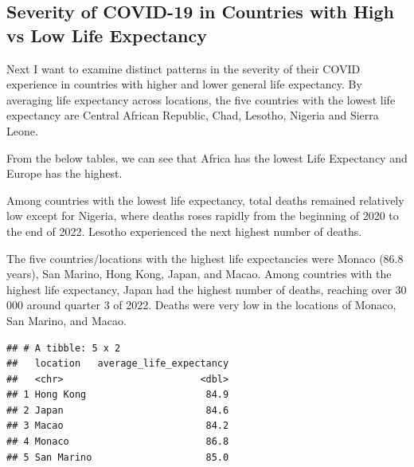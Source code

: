 \documentclass[11pt,preprint, authoryear]{elsarticle}
\numberwithin{equation}{section}
\numberwithin{figure}{section}
\numberwithin{table}{section}
\begin{document}
\hypertarget{severity-of-covid-19-in-countries-with-high-vs-low-life-expectancy}{%
\subsection{Severity of COVID-19 in Countries with High vs Low Life
Expectancy}\label{severity-of-covid-19-in-countries-with-high-vs-low-life-expectancy}}

Next I want to examine distinct patterns in the severity of their COVID
experience in countries with higher and lower general life expectancy.
By averaging life expectancy across locations, the five countries with
the lowest life expectancy are Central African Republic, Chad, Lesotho,
Nigeria and Sierra Leone.

From the below tables, we can see that Africa has the lowest Life
Expectancy and Europe has the highest.

Among countries with the lowest life expectancy, total deaths remained
relatively low except for Nigeria, where deaths roses rapidly from the
beginning of 2020 to the end of 2022. Lesotho experienced the next
highest number of deaths.

The five countries/locations with the highest life expectancies were
Monaco (86.8 years), San Marino, Hong Kong, Japan, and Macao. Among
countries with the highest life expectancy, Japan had the highest number
of deaths, reaching over 30 000 around quarter 3 of 2022. Deaths were
very low in the locations of Monaco, San Marino, and Macao.

\begin{verbatim}
## # A tibble: 5 x 2
##   location   average_life_expectancy
##   <chr>                        <dbl>
## 1 Hong Kong                     84.9
## 2 Japan                         84.6
## 3 Macao                         84.2
## 4 Monaco                        86.8
## 5 San Marino                    85.0
\end{verbatim}
\end{document}
